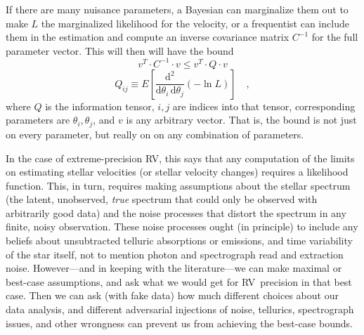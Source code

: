 \documentclass[modern]{aastex62}
\newcommand{\dd}{\mathrm{d}}
\newcommand{\acronym}[1]{{\small{#1}}}
\newcommand{\RV}{\acronym{RV}}
\begin{document}
If there are many nuisance parameters, a Bayesian can marginalize them
out to make $L$ the marginalized likelihood for the velocity, or a frequentist
can include them in the estimation and compute an inverse covariance matrix $C^{-1}$
for the full parameter vector.
This will then will have the bound
\begin{equation}
v^T\cdot C^{-1}\cdot v \leq v^T\cdot Q\cdot v
\end{equation}
\begin{equation}
Q_{ij} \equiv E\left[\frac{\dd^2}{\dd\theta_i\,\dd\theta_j}(-\ln L)\right] \quad,
\end{equation}
where $Q$ is the information tensor, $i,j$ are indices into that
tensor, corresponding parameters are $\theta_i, \theta_j$, and $v$ is
any arbitrary vector.
That is, the bound is not just on every parameter, but really on on
any combination of parameters.

In the case of extreme-precision \RV, this says that any computation of the limits
on estimating stellar velocities (or stellar velocity changes)
requires a likelihood function.
This, in turn, requires making assumptions about the stellar spectrum (the
latent, unobserved, \emph{true} spectrum that could only be observed
with arbitrarily good data) and the noise processes that distort the
spectrum in any finite, noisy observation.
These noise processes ought (in principle) to include any beliefs about
unsubtracted telluric absorptions or emissions, and time variability
of the star itself, not to mention photon and spectrograph read and
extraction noise.
However---and in keeping with the literature---we can make maximal or
best-case assumptions, and ask what we would get for \RV\ precision
in that best case.
Then we can ask (with fake data) how much different choices about our
data analysis, and different adversarial injections of noise,
tellurics, spectrograph issues, and other wrongness can prevent us
from achieving the best-case bounds.
\end{document}
